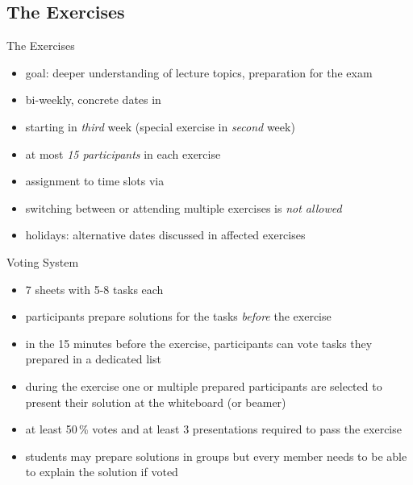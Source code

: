 \subsection{The Exercises}
\begin{frame}{\insertsubsection}
	\small
	\begin{fancycolumns}[widths={30}]
		\begin{definition}{The Exercises}
			\begin{itemize}
				\item goal: deeper understanding of lecture topics, preparation for the exam
				\item bi-weekly, concrete dates in \StudIPExercise
				\item starting in \emph{third} week (special exercise in \emph{second} week)
				\item at most \emph{15 participants} in each exercise
				\item assignment to time slots via \StudIPExercise
				\item switching between or attending multiple exercises is \emph{not allowed}
				\item holidays: alternative dates discussed in affected exercises
			\end{itemize}
		\end{definition}
		\nextcolumn
		\begin{definition}{Voting System }
			\begin{itemize}
				\item 7 sheets with 5-8 tasks each
				\item participants prepare solutions for the tasks \emph{before} the exercise
				\item in the 15 minutes before the exercise, participants can vote  tasks they prepared in a dedicated list 
				\item during the exercise one or multiple prepared participants are selected to present their solution at the whiteboard (or beamer)
				\item at least 50\,\% votes  and at least 3 presentations  required to pass the exercise 
				\item students may prepare solutions in groups but every member needs to be able to explain the solution if voted

\end{itemize}
\end{definition}
\end{fancycolumns}
\end{frame}
